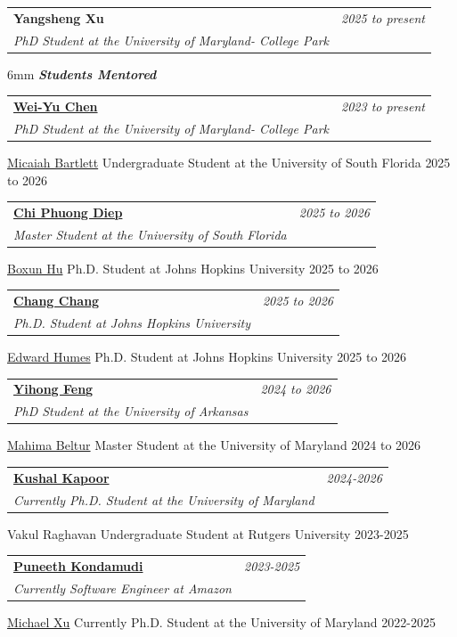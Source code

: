 \documentclass[a4paper,11pt]{article}
\makeatletter
\newcommand{\resumeProject}[4]{
\vspace{0.5mm}\item
    \begin{tabular*}{0.98\textwidth}[t]{l@{\extracolsep{\fill}}r}
        \textbf{#1} & \textit{\footnotesize{#3}} \\
        \footnotesize{\textit{#2}} & \footnotesize{#4}
    \end{tabular*}
    \vspace{-2.4mm}
}
\makeatother
\begin{document}
\resumeProject
  {Yangsheng Xu}
  {PhD Student at the University of Maryland- College Park}
  {2025 to present}

\vspace{6mm}
\textit{\textbf{Students Mentored}}
\vspace{0.4mm}

\resumeProject
  {\href{https://www.linkedin.com/in/william-chen-01282b146//}{Wei-Yu Chen}}
  {PhD Student at the University of Maryland- College Park}
  {2023 to present}

\resumeProject
{\href{https://www.linkedin.com/in/micaiahbartlett/}{Micaiah Bartlett}}
  {Undergraduate Student at the University of South Florida}
  {2025 to 2026}

\resumeProject
  {\href{https://www.linkedin.com/in/chi-diep/}{Chi Phuong Diep}}
  {Master Student at the University of South Florida}
  {2025 to 2026}

\resumeProject
  {\href{https://www.linkedin.com/in/boxun-hu-xxx4290325/}{Boxun Hu}}
  {Ph.D. Student at Johns Hopkins University}
  {2025 to 2026}

\resumeProject
  {\href{https://www.linkedin.com/in/chang-chang-09791b2b6/}{Chang Chang}}
  {Ph.D. Student at Johns Hopkins University}
  {2025 to 2026}

\resumeProject
  {\href{https://www.linkedin.com/in/edward-humes-830b7217a/}{Edward Humes}}
  {Ph.D. Student at Johns Hopkins University}
  {2025 to 2026}

\resumeProject
  {\href{https://www.linkedin.com/in/yihong-feng-340221143/}{Yihong Feng}}
  {PhD Student at the University of Arkansas}
  {2024 to 2026}

\resumeProject
  {\href{https://www.linkedin.com/in/mahima-beltur/}{Mahima Beltur}}
  {Master Student at the University of Maryland}
  {2024 to 2026}

\resumeProject
  {\href{https://www.linkedin.com/in/kushalkapoor25/}{Kushal Kapoor}}
  {Currently Ph.D. Student at the University of Maryland}
  {2024-2026}

\resumeProject
  {Vakul Raghavan}
  {Undergraduate Student at Rutgers University}
  {2023-2025}

\resumeProject
  {\href{https://www.linkedin.com/in/puneethk26/}{Puneeth Kondamudi}}
  {Currently Software Engineer at Amazon}
  {2023-2025}

\resumeProject
  {\href{https://www.linkedin.com/in/michael-xu-39001b134/}{Michael Xu}}
  {Currently Ph.D. Student at the University of Maryland}
  {2022-2025}
\end{document}
